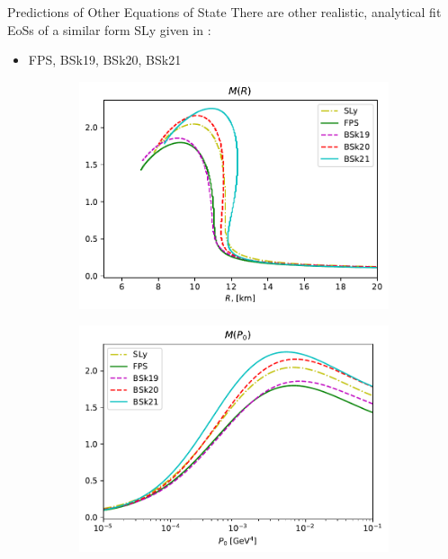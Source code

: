 \documentclass[handout]{beamer}
\begin{document}
    \begin{frame}{Predictions of Other Equations of State}
        There are other realistic, analytical fit EoSs of a similar form SLy given in \autocite{SLy_2004,BSk_2013}: \begin{itemize}
            \item FPS, BSk19, BSk20, BSk21 \pause
        \end{itemize}
        \vspace{-10pt}
        \begin{figure}[h!]
            \centering
            \begin{subfigure}{.5\textwidth}
                \includegraphics[width = \textwidth]{r_analysis,all.pdf}
            \end{subfigure}%
            \begin{subfigure}{.5\textwidth}
                \includegraphics[width = \textwidth]{p0_analysis,all.pdf} 

\end{subfigure}
\end{figure}
\end{frame}
\end{document}
